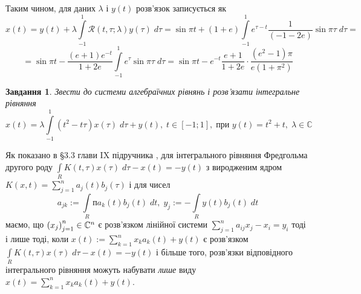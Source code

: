 \documentclass[12pt]{article} %
\newtheorem{prob}{Завдання}
\newcommand{\dt}{\;dt}
\let\oldint\int
\renewcommand{\int}{\oldint\limits}
\begin{document}
	Таким чином, для даних $\lambda$ і $y(t)$ розв’язок записується як
	\[x(t)=y(t)+\lambda\int_{-1}^1\mathcal{R}(t,\tau;\lambda)y(\tau)\;d\tau=\sin\pi t+(1+e)\int_{-1}^1e^{\tau-t}\frac{1}{(-1-2e)}
	\sin\pi\tau\;d\tau=\]
	\[=\sin\pi t-\frac{(e+1)e^{-t}}{1+2e}\int_{-1}^1e^\tau\sin\pi\tau\;d\tau=\sin\pi t-e^{-t}\frac{e+1}{1+2e}\cdot
	\frac{(e^2-1)\pi}{e(1+\pi^2)}\]
\begin{prob}Звести до системи алгебраїчних рівнянь і розв’язати інтегральне рівняння
	\[x(t)=\lambda\int_{-1}^1(t^2-t\tau)x(\tau)\;d\tau+y(t),\;t\in[-1;1],\;\mbox{при }y(t)=t^2+t,\;\lambda\in\mathbb{C}\]
\end{prob}
Як показано в \S 3.3 глави IX підручника \cite{tb}, для інтегрального рівняння Фредгольма другого роду $\int_RK(t,\tau)x(\tau)\;d\tau
-x(t)=-y(t)$ з виродженим ядром $K(x,t)=\sum_{j=1}^n a_j(t)b_j(\tau)$ і для чисел
\[a_{jk}:=\int_Rпa_k(t)b_j(t)\dt,\;y_j:=-\int_Ry(t)b_j(t)\dt\]
маємо, що $\left(x_j\right)_{j=1}^n\in\mathbb{C}^n$ є розв’язком лінійної системи
$\sum_{j=1}^na_{ij}x_j-x_i=y_i$ тоді і лише тоді, коли $x(t):=\sum_{k=1}^nx_ka_k(t)+y(t)$ є розв’язком $\int_RK(t,\tau)x(\tau)\;d\tau
-x(t)=-y(t)$ і більше того,
розв’язки відповідного інтегрального рівняння можуть набувати {\it лише} виду $x(t)=\sum_{k=1}^nx_ka_k(t)+y(t)$.
\end{document}
